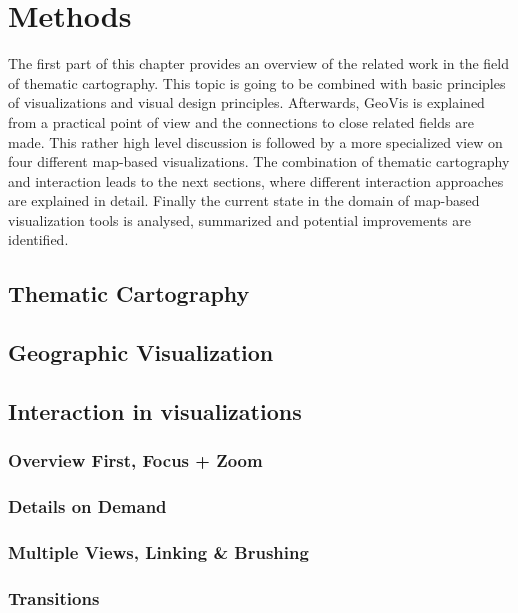\section{Methods}
The first part of this chapter provides an overview of the related work in the field of
thematic cartography. This topic is going to be combined with basic principles of visualizations and visual design principles. Afterwards, \ac{GeoVis} is explained from a practical point of view and the connections to close related fields are made. This rather high level discussion is followed by a more specialized view on four different map-based visualizations. The combination of thematic cartography and interaction leads to the next sections, where different interaction approaches are explained in detail. Finally the current state in the domain of map-based visualization tools is analysed, summarized and potential improvements are identified.

\subsection{Thematic Cartography}
\label{s:cartography}


\subsection{Geographic Visualization}

\subsection{Interaction in visualizations}
\label{s:interaction}

\subsubsection{Overview First, Focus + Zoom}

\subsubsection{Details on Demand}

\subsubsection{Multiple Views, Linking \& Brushing}

\subsubsection{Transitions}

